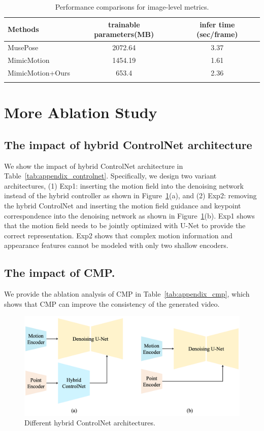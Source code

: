 \begin{table}[t]
\caption{Performance comparisons for image-level metrics.}
\centering
\begin{tabular}{lcc}
\toprule
Methods  & trainable parameters(MB) & infer time (sec/frame) \\
\midrule
MusePose	&2072.64	&3.37 \\
MimicMotion	&1454.19	&1.61 \\
MimicMotion+Ours	&653.4	&2.36\\
\bottomrule
\label{tab:appendix_eff}
\end{tabular}
\end{table}

{
\section{More Ablation Study}
\subsection{The impact of hybrid ControlNet architecture}
We show the impact of hybrid ControlNet architecture in Table~\ref{tab:appendix_controlnet}. Specifically, we design two variant architectures, (1) Exp1: inserting the motion field into the denoising network instead of the hybrid controller as shown in Figure~\ref{fig: appendix_abs_pipeline}(a), and (2) Exp2: removing the hybrid ControlNet and inserting the motion field guidance and keypoint correspondence into the denoising network as shown in Figure~\ref{fig: appendix_abs_pipeline}(b). Exp1 shows that the motion field needs to be jointly optimized with U-Net to provide the correct representation. Exp2 shows that complex motion information and appearance features cannot be modeled with only two shallow encoders.
}
{
\subsection{The impact of CMP.}
We provide the ablation analysis of CMP in Table~\ref{tab:appendix_cmp}, which shows that CMP can improve the consistency of the generated video.
}

\begin{figure}[h!]
    \centering
    \includegraphics[width=.9\columnwidth]{./image/abs_pipeline.png}
    \vspace{-15pt}
    \caption{Different hybrid ControlNet architectures.}
    \label{fig: appendix_abs_pipeline}
\end{figure}

